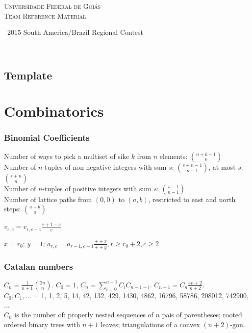 \documentclass[a4paper,12pt]{article}
\newcommand\includesfile[4]{
  \subsection{#2}
  \begin{multicols}{2}
    
  \end{multicols}
}
\begin{document}
\thispagestyle{fancy}
\begin{center}
  \Huge\textsc{Universidade Federal de Goiás \\ Team Reference Material}
	
	\
	\small 2015 South America/Brazil Regional Contest
\end{center}

\begin{multicols}{2}
  \tableofcontents
\end{multicols}

\


\newpage

\includesfile{c++}{Template}{config}{template.cpp}

\section{Combinatorics}
\subsubsection{Binomial Coefficients}

Number of ways to pick a multiset of sike $k$ from $n$ elements: $\binom{n+k-1}{k}$\\
Number of $n$-tuples of non-negative integers with sum $s$: $\binom{s+n-1}{n-1}$, at most $s$: $\binom{s+n}{n}$\\
Number of $n$-tuples of positive integers with sum $s$: $\binom{s-1}{n-1}$\\
Number of lattice paths from $(0,0)$ to $(a,b)$, restricted to east and north steps: $\binom{a+b}{a}$

$v_{r,c} = v_{r,c-1} \frac{r+1-c}{c}$

$x = r_0$; $y = 1$; $a_{r,c} = a_{r-1,c-1}  \frac{++x}{++y}, r \geq r_0+2, c \geq 2$

\subsubsection{Catalan numbers}
$C_{n} = \frac{1}{n+1}\binom{2n}{n}$. $C_0 = 1$,  $C_{n} = \sum_{i=0}^{n-1}C_iC_{n-1-i}$. $C_{n+1} = C_{n}\frac{4n+2}{n+2}$.\\
$C_0,C_1,... $ = 1, 1, 2, 5, 14, 42, 132, 429, 1430, 4862, 16796, 58786, 208012, 742900, ...\\
$C_{n}$ is the number of: properly nested sequences of $n$ pais of parentheses; rooted ordered binary trees with $n+1$ leaves; triangulations of a convex $(n+2)$-gon.
\end{document}
